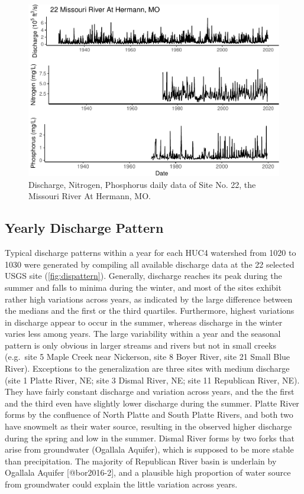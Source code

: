 \documentclass[12pt,]{article}
\makeatletter
\def\maxwidth{\ifdim\Gin@nat@width>\linewidth\linewidth\else\Gin@nat@width\fi}
\makeatother
\begin{document}
\begin{figure}[H]
\includegraphics[width=\maxwidth]{Missouri-Reasearch-Project---FINAL_files/figure-latex/dataexample-1} \caption{\label{fig:dataexample} Discharge, Nitrogen, Phosphorus daily data of Site No. 22, the  Missouri River At Hermann, MO.}\label{fig:dataexample}
\end{figure}

\hypertarget{yearly-discharge-pattern}{%
\subsection{Yearly Discharge Pattern}\label{yearly-discharge-pattern}}

Typical discharge patterns within a year for each HUC4 watershed from
1020 to 1030 were generated by compiling all available discharge data at
the 22 selected USGS site (\autoref{fig:dispattern}). Generally,
discharge reaches its peak during the summer and falls to minima during
the winter, and most of the sites exhibit rather high variations across
years, as indicated by the large difference between the medians and the
first or the third quartiles. Furthermore, highest variations in
discharge appear to occur in the summer, whereas discharge in the winter
varies less among years. The large variability within a year and the
seasonal pattern is only obvious in larger streams and rivers but not in
small creeks (e.g.~site 5 Maple Creek near Nickerson, site 8 Boyer
River, site 21 Small Blue River). Exceptions to the generalization are
three sites with medium discharge (site 1 Platte River, NE; site 3
Dismal River, NE; site 11 Republican River, NE). They have fairly
constant discharge and variation across years, and the the first and the
third even have slightly lower discharge during the summer. Platte River
forms by the confluence of North Platte and South Platte Rivers, and
both two have snowmelt as their water source, resulting in the observed
higher discharge during the spring and low in the summer. Dismal River
forms by two forks that arise from groundwater (Ogallala Aquifer), which
is supposed to be more stable than precipitation. The majority of
Republican River basin is underlain by Ogallala Aquifer
{[}@bor2016-2{]}, and a plausible high proportion of water source from
groundwater could explain the little variation across years.
\end{document}
